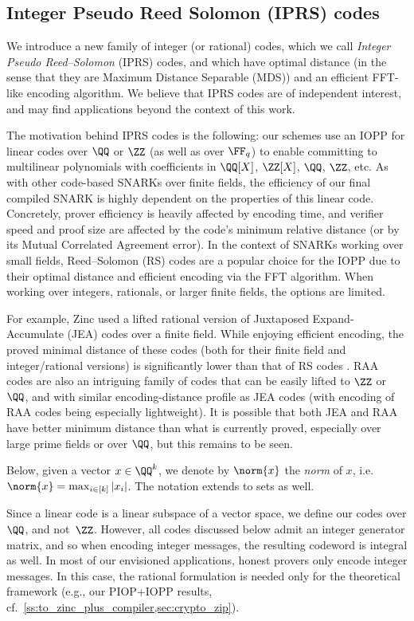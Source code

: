 \subsection{Integer Pseudo Reed Solomon (IPRS) codes}
\label{ss:to_iprs}


We introduce a new family of integer (or rational) codes, which we call \emph{Integer Pseudo Reed--Solomon} (IPRS) codes, and which have optimal distance (in the sense that they are Maximum Distance Separable (MDS)) and an efficient FFT-like encoding algorithm.  We believe that IPRS codes are of independent interest, and may find applications beyond the context of this work.


The motivation behind IPRS codes  is the following: our schemes use an IOPP for linear codes over $\QQ$ or $\ZZ$ (as well as over $\FF_q$) to enable committing to multilinear polynomials with coefficients in $\QQ[X]$, $\ZZ[X]$, $\QQ$, $\ZZ$, etc. As with other code-based SNARKs over finite fields, the efficiency of our final compiled SNARK is highly dependent on the properties of this linear code. Concretely, prover efficiency is heavily affected by encoding time, and verifier speed and proof size are affected by the code's minimum relative distance (or by its Mutual Correlated Agreement error). In the context of SNARKs working over small fields, Reed--Solomon (RS) codes are a popular choice for the IOPP due to their optimal distance and efficient encoding via the FFT algorithm. When working over integers, rationals, or larger finite fields, the options are limited.

For example, Zinc \cite{Zinc} used a lifted rational version  of Juxtaposed Expand-Accumulate (JEA) codes over a finite field. While enjoying efficient encoding, the proved minimal distance of these codes (both for their finite field and integer/rational versions) is significantly lower than that of RS codes \cite{jea_codes}. RAA codes \cite{blaze} are also an intriguing family of codes that can be easily lifted to $\ZZ$ or $\QQ$, and with similar encoding-distance profile as JEA codes (with encoding of RAA codes being especially lightweight). It is possible that both JEA and RAA have better minimum distance than what is currently proved, especially over large prime fields or over $\QQ$, but this remains to be seen.


Below, given a vector $x\in \QQ^k$, we denote by $\norm{x}$ the \emph{norm} of $x$, i.e.\ $\norm{x}=\max_{i\in [k]}|x_i|$. The notation extends to sets as well. 


\begin{remark}
\label{rem:rational-code}
 Since a linear code is a linear subspace of a vector space, we define our codes over $\QQ$, and not~$\ZZ$. However, all codes discussed below admit an integer generator matrix, and so when encoding integer messages, the resulting codeword is integral as well.  In most of our envisioned applications, honest provers only encode integer messages. In this case, the rational formulation is needed only for the theoretical framework (e.g., our PIOP+IOPP results, cf.\ \cref{ss:to_zinc_plus_compiler,sec:crypto_zip}).
\end{remark}

